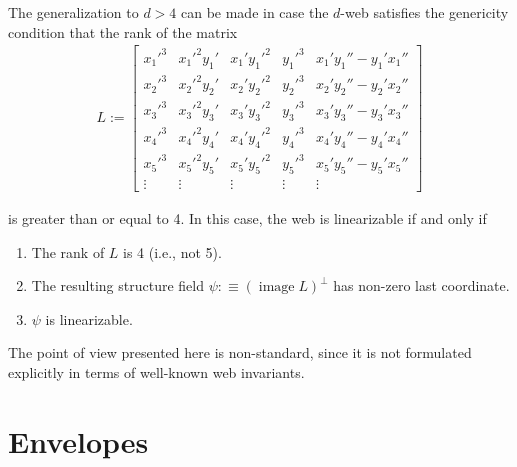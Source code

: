 \documentclass[12pt]{article}
\numberwithin{equation}{section}
\theoremstyle{plain}
\theoremstyle{definition}
\newcommand{\im}{\operatorname{image}}
\begin{document}
The generalization to $d>4$ can be made in case the $d$-web satisfies the genericity condition that the rank of the matrix
\begin{align*}
L:=\begin{bmatrix}
x_{1}'^{3} & x_{1}'^{2}y_{1}' & x_{1}'y_{1}'^{2} & y_{1}'^{3}&x_{1}'y_{1}''-y_{1}'x_{1}''\\
x_{2}'^{3} & x_{2}'^{2}y_{2}' & x_{2}'y_{2}'^{2} & y_{2}'^{3}&x_{2}'y_{2}''-y_{2}'x_{2}''\\
x_{3}'^{3} & x_{3}'^{2}y_{3}' & x_{3}'y_{3}'^{2} & y_{3}'^{3}&x_{3}'y_{3}''-y_{3}'x_{3}''\\
x_{4}'^{3} & x_{4}'^{2}y_{4}' & x_{4}'y_{4}'^{2} & y_{4}'^{3}&x_{4}'y_{4}''-y_{4}'x_{4}''\\
x_{5}'^{3} & x_{5}'^{2}y_{5}' & x_{5}'y_{5}'^{2} & y_{5}'^{3}&x_{5}'y_{5}''-y_{5}'x_{5}''\\
\vdots & \vdots & \vdots & \vdots & \vdots 
\end{bmatrix}
\end{align*}

is greater than or equal to 4. In this case, the web is linearizable if and only if
\begin{enumerate}
\itemsep0em
\item{The rank of $L$ is 4 (i.e., not 5).}
\item{The resulting structure field $\psi:\equiv (\im L)^{\perp}$ has non-zero last coordinate.}
\item{$\psi$ is linearizable.}
\end{enumerate}

The point of view presented here is non-standard, since it is not formulated explicitly in terms of well-known web invariants.

\section{Envelopes}\label{envsec}
\end{document}
